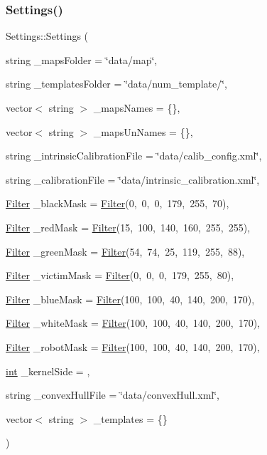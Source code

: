 \subsubsection{\texorpdfstring{Settings()}{Settings()}}
{\footnotesize\ttfamily Settings\+::\+Settings (\begin{DoxyParamCaption}\item[{string}]{\+\_\+maps\+Folder = {\ttfamily \char`\"{}data/map\char`\"{}},  }\item[{string}]{\+\_\+templates\+Folder = {\ttfamily \char`\"{}data/num\+\_\+template/\char`\"{}},  }\item[{vector$<$ string $>$}]{\+\_\+maps\+Names = {\ttfamily \{\}},  }\item[{vector$<$ string $>$}]{\+\_\+maps\+Un\+Names = {\ttfamily \{\}},  }\item[{string}]{\+\_\+intrinsic\+Calibration\+File = {\ttfamily \char`\"{}data/calib\+\_\+config.xml\char`\"{}},  }\item[{string}]{\+\_\+calibration\+File = {\ttfamily \char`\"{}data/intrinsic\+\_\+calibration.xml\char`\"{}},  }\item[{\mbox{\hyperlink{class_filter}{Filter}}}]{\+\_\+black\+Mask = {\ttfamily \mbox{\hyperlink{class_filter}{Filter}}(0,~0,~0,~179,~255,~70)},  }\item[{\mbox{\hyperlink{class_filter}{Filter}}}]{\+\_\+red\+Mask = {\ttfamily \mbox{\hyperlink{class_filter}{Filter}}(15,~100,~140,~160,~255,~255)},  }\item[{\mbox{\hyperlink{class_filter}{Filter}}}]{\+\_\+green\+Mask = {\ttfamily \mbox{\hyperlink{class_filter}{Filter}}(54,~74,~25,~119,~255,~88)},  }\item[{\mbox{\hyperlink{class_filter}{Filter}}}]{\+\_\+victim\+Mask = {\ttfamily \mbox{\hyperlink{class_filter}{Filter}}(0,~0,~0,~179,~255,~80)},  }\item[{\mbox{\hyperlink{class_filter}{Filter}}}]{\+\_\+blue\+Mask = {\ttfamily \mbox{\hyperlink{class_filter}{Filter}}(100,~100,~40,~140,~200,~170)},  }\item[{\mbox{\hyperlink{class_filter}{Filter}}}]{\+\_\+white\+Mask = {\ttfamily \mbox{\hyperlink{class_filter}{Filter}}(100,~100,~40,~140,~200,~170)},  }\item[{\mbox{\hyperlink{class_filter}{Filter}}}]{\+\_\+robot\+Mask = {\ttfamily \mbox{\hyperlink{class_filter}{Filter}}(100,~100,~40,~140,~200,~170)},  }\item[{\mbox{\hyperlink{draw_8hh_aa620a13339ac3a1177c86edc549fda9b}{int}}}]{\+\_\+kernel\+Side = {},  }\item[{string}]{\+\_\+convex\+Hull\+File = {\ttfamily \char`\"{}data/convexHull.xml\char`\"{}},  }\item[{vector$<$ string $>$}]{\+\_\+templates = {\ttfamily \{\}} }\end{DoxyParamCaption})}



